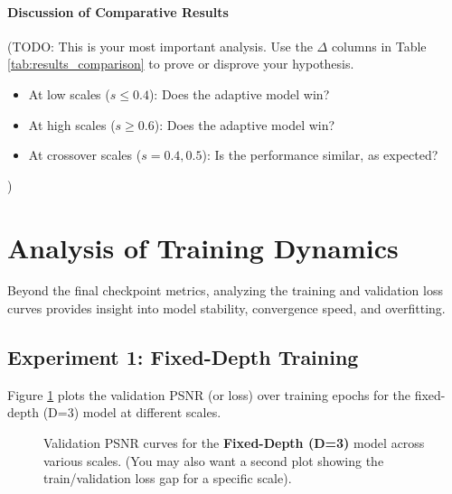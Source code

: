 \paragraph{Discussion of Comparative Results}
(TODO: This is your most important analysis. Use the $\Delta$ columns in Table \ref{tab:results_comparison} to prove or disprove your hypothesis.
\begin{itemize}
    \item At low scales ($s \le 0.4$): Does the adaptive model win?
    \item At high scales ($s \ge 0.6$): Does the adaptive model win?
    \item At crossover scales ($s=0.4, 0.5$): Is the performance similar, as expected?
\end{itemize}
)
\section{Analysis of Training Dynamics}
\label{sec:results_training_dynamics}

Beyond the final checkpoint metrics, analyzing the training and validation loss curves provides insight into model stability, convergence speed, and overfitting.

\subsection{Experiment 1: Fixed-Depth Training}
Figure \ref{fig:train_fixed} plots the validation PSNR (or loss) over training epochs for the fixed-depth (D=3) model at different scales.

\begin{figure}[h!]
    \centering
    
    \caption{Validation PSNR curves for the \textbf{Fixed-Depth (D=3)} model across various scales. (You may also want a second plot showing the train/validation loss gap for a specific scale).}
    \label{fig:train_fixed}
\end{figure}

